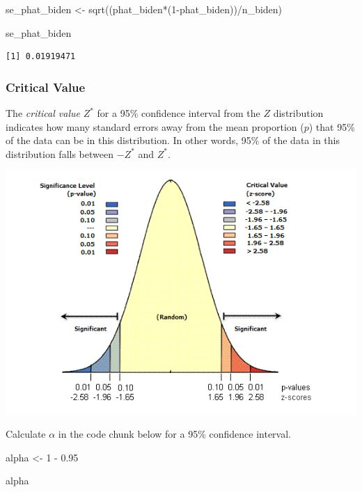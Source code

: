 \documentclass[
  letterpaper,
  DIV=11,
  numbers=noendperiod]{scrartcl}
\newenvironment{Shaded}{\begin{snugshade}}{\end{snugshade}}
\newcommand{\DecValTok}[1]{\textcolor[rgb]{0.68,0.00,0.00}{#1}}
\newcommand{\FloatTok}[1]{\textcolor[rgb]{0.68,0.00,0.00}{#1}}
\newcommand{\FunctionTok}[1]{\textcolor[rgb]{0.28,0.35,0.67}{#1}}
\newcommand{\NormalTok}[1]{\textcolor[rgb]{0.00,0.23,0.31}{#1}}
\newcommand{\OtherTok}[1]{\textcolor[rgb]{0.00,0.23,0.31}{#1}}
\newcommand{\SpecialCharTok}[1]{\textcolor[rgb]{0.37,0.37,0.37}{#1}}
\begin{document}
\begin{Shaded}
\begin{Highlighting}[]
\NormalTok{se\_phat\_biden }\OtherTok{\textless{}{-}} \FunctionTok{sqrt}\NormalTok{((phat\_biden}\SpecialCharTok{*}\NormalTok{(}\DecValTok{1}\SpecialCharTok{{-}}\NormalTok{phat\_biden))}\SpecialCharTok{/}\NormalTok{n\_biden)}

\NormalTok{se\_phat\_biden}
\end{Highlighting}
\end{Shaded}

\begin{verbatim}
[1] 0.01919471
\end{verbatim}

\subsubsection{Critical Value}\label{critical-value}

The \emph{critical value} \(Z^*\) for a 95\% confidence interval from
the \(Z\) distribution indicates how many standard errors away from the
mean proportion (\(p\)) that 95\% of the data can be in this
distribution. In other words, 95\% of the data in this distribution
falls between \(-Z^*\) and \(Z^*\).

\includegraphics{homework4_answer_key_files/mediabag/z-scores.png}

Calculate \(\alpha\) in the code chunk below for a 95\% confidence
interval.

\begin{Shaded}
\begin{Highlighting}[]
\NormalTok{alpha }\OtherTok{\textless{}{-}} \DecValTok{1} \SpecialCharTok{{-}} \FloatTok{0.95}

\NormalTok{alpha}
\end{Highlighting}
\end{Shaded}
\end{document}
